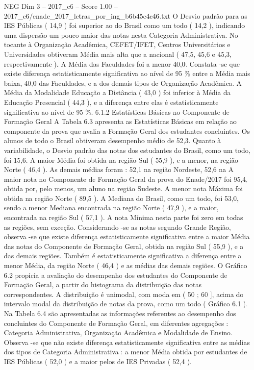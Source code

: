\begin{textsample}{NEG Dim 3 – 2017\_c6 – Score 1.00 – 2017\_c6/enade\_2017\_letras\_por\_ing\_b6b45c4c46.txt}
O Desvio padrão para as IES Públicas ( 14,9 ) foi superior ao do Brasil como um todo ( 14,2 ), indicando uma dispersão um pouco maior das notas nesta Categoria Administrativa.
No tocante à Organização Acadêmica, CEFET/IFET, Centros Universitários e Universidades obtiveram Média mais alta que a nacional ( 47,5, 45,6 e 45,3, respectivamente ).
A Média das Faculdades foi a menor 40,0.
Constata -se que existe diferença estatisticamente significativa ao nível de 95 \% entre a Média mais baixa, 40,0 das Faculdades, e a dos demais tipos de Organização Acadêmica.
A Média da Modalidade Educação a Distância ( 43,0 ) foi inferior à Média da Educação Presencial ( 44,3 ), e a diferença entre elas é estatisticamente significativa ao nível de 95 \%. 6.1.2 Estatísticas Básicas no Componente de Formação Geral A Tabela 6.3 apresenta as Estatísticas Básicas em relação ao componente da prova que avalia a Formação Geral dos estudantes concluintes.
Os alunos de todo o Brasil obtiveram desempenho médio de 52,3.
Quanto à variabilidade, o Desvio padrão das notas dos estudantes do Brasil, como um todo, foi 15,6.
A maior Média foi obtida na região Sul ( 55,9 ), e a menor, na região Norte ( 46,4 ).
As demais médias foram : 52,1 na região Nordeste, 52,6 na A maior nota no Componente de Formação Geral da prova do Enade/2017 foi 95,4, obtida por, pelo menos, um aluno na região Sudeste.
A menor nota Máxima foi obtida na região Norte ( 89,5 ).
A Mediana do Brasil, como um todo, foi 53,0, sendo a menor Mediana encontrada na região Norte ( 47,9 ), e a maior, encontrada na região Sul ( 57,1 ).
A nota Mínima nesta parte foi zero em todas as regiões, sem exceção.
Considerando -se as notas segundo Grande Região, observa -se que existe diferença estatisticamente significativa entre a maior Média das notas do Componente de Formação Geral, obtida na região Sul ( 55,9 ), e a das demais regiões.
Também é estatisticamente significativa a diferença entre a menor Média, da região Norte ( 46,4 ) e as médias das demais regiões.
O Gráfico 6.2 propicia a avaliação do desempenho dos estudantes do Componente de Formação Geral, a partir do histograma da distribuição das notas correspondentes.
A distribuição é unimodal, com moda em ( 50 ; 60 ], acima do intervalo modal da distribuição de notas da prova, como um todo ( Gráfico 6.1 ).
Na Tabela 6.4 são apresentadas as informações referentes ao desempenho dos concluintes do Componente de Formação Geral, em diferentes agregações : Categoria Administrativa, Organização Acadêmica e Modalidade de Ensino.
Observa -se que não existe diferença estatisticamente significativa entre as médias dos tipos de Categoria Administrativa : a menor Média obtida por estudantes de IES Públicas ( 52,0 ) e a maior pelos de IES Privadas ( 52,4 ).

\end{textsample}

